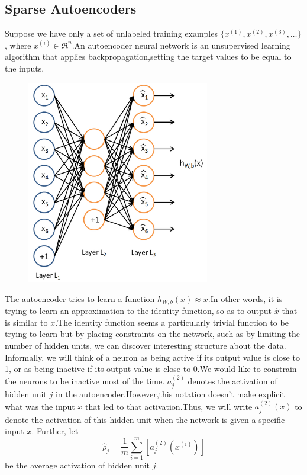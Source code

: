 \documentclass[18pt,letterpaper]{article}
\begin{document}
\subsection{Sparse Autoencoders}
Suppose we have only a set of unlabeled training examples $\textstyle \{x^{(1)}, x^{(2)}, x^{(3)}, \ldots\}$,
where $\textstyle x^{(i)} \in \Re^{n}$.An autoencoder neural network is an unsupervised learning algorithm that applies backpropagation,setting the target values to be equal to the inputs.
\begin{figure}[ht!]
\includegraphics[width=8cm]{2.png}
\end{figure}
The autoencoder tries to learn a function $\textstyle h_{W,b}(x) \approx x $.In other
words, it is trying to learn an approximation to the identity function, so as
to output $\textstyle \hat{x}$ that is similar to $\textstyle x$.The identity function seems a
particularly trivial function to be trying to learn but by placing constraints
on the network, such as by limiting the number of hidden units, we can discover
interesting structure about the data.
Informally, we will think of a neuron as being active if its output value is close to 1, or as being inactive if its output value is
close to 0.We would like to constrain the neurons to be inactive most of the
time. 
$\textstyle a^{(2)}_j$ denotes the activation of hidden unit $\textstyle j$ in the
autoencoder.However,this notation doesn't make explicit what was the input $ x $
that led to that activation.Thus, we will write $\textstyle a^{(2)}_j(x)$ to denote the activation
of this hidden unit when the network is given a specific input $\textstyle x$.  Further, let
$$\hat\rho_j = \frac{1}{m} \sum_{i=1}^m \left[ a^{(2)}_j(x^{(i)}) \right]
$$ be the average activation of hidden unit $\textstyle j$.
\end{document}
